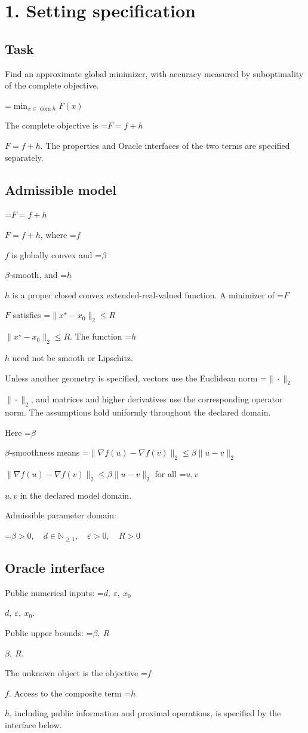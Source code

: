 \documentclass[10pt,a4paper]{article}
\newcommand{\AtlasMath}[1]{\par\begingroup\centering\setbox0=\hbox{$\displaystyle #1$}\ifdim\wd0>1.4\linewidth\typeout{ATLAS WIDE FORMULA: \the\wd0}\fi\ifdim\wd0>\linewidth\resizebox{\linewidth}{!}{\box0}\else\box0\fi\par\endgroup}
\newcommand{\AtlasInlineMath}[1]{\begingroup\setbox0=\hbox{$#1$}\ifdim\wd0>.4\linewidth\endgroup\AtlasMath{#1}\else\endgroup$#1$\fi}
\begin{document}
\section{1. Setting specification}
\subsection{Task}
Find an approximate global minimizer, with accuracy measured by suboptimality of the complete objective.


\AtlasMath{\min_{x\in \operatorname{dom}h}F(x)}


The complete objective is \AtlasInlineMath{F=f+h}. The properties and Oracle interfaces of the two terms are specified separately.

\subsection{Admissible model}
\AtlasInlineMath{F=f+h}, where \AtlasInlineMath{f} is globally convex and \AtlasInlineMath{\beta}-smooth, and \AtlasInlineMath{h} is a proper closed convex extended-real-valued function. A minimizer of \AtlasInlineMath{F} satisfies \AtlasInlineMath{\|x^\star-x_0\|_2\le R}. The function \AtlasInlineMath{h} need not be smooth or Lipschitz.

Unless another geometry is specified, vectors use the Euclidean norm \AtlasInlineMath{\|\cdot\|_2}, and matrices and higher derivatives use the corresponding operator norm. The assumptions hold uniformly throughout the declared domain.

Here \AtlasInlineMath{\beta}-smoothness means \AtlasInlineMath{\|\nabla f(u)-\nabla f(v)\|_2\le\beta\|u-v\|_2} for all \AtlasInlineMath{u,v} in the declared model domain.

Admissible parameter domain:


\AtlasMath{\beta>0,\quad d\in\mathbb{N}_{\ge1},\quad \varepsilon>0,\quad R>0}


\subsection{Oracle interface}
Public numerical inputs: \AtlasInlineMath{d,\ \varepsilon,\ x_0}.

Public upper bounds: \AtlasInlineMath{\beta,\ R}.

The unknown object is the objective \AtlasInlineMath{f}. Access to the composite term \AtlasInlineMath{h}, including public information and proximal operations, is specified by the interface below.
\end{document}
